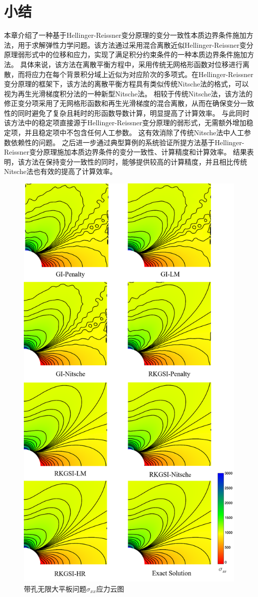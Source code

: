\section{小结}
本章介绍了一种基于Hellinger-Reissner变分原理的变分一致性本质边界条件施加方法，用于求解弹性力学问题。该方法通过采用混合离散近似Hellinger-Reissner变分原理弱形式中的位移和应力，实现了满足积分约束条件的一种本质边界条件施加方法。
具体来说，该方法在离散平衡方程中，采用传统无网格形函数对位移进行离散，而将应力在每个背景积分域上近似为对应阶次的多项式。在Hellinger-Reissner变分原理的框架下，该方法的离散平衡方程具有类似传统Nitsche法的格式，可以视为再生光滑梯度积分法的一种新型Nitsche法。
相较于传统Nitsche法，该方法的修正变分项采用了无网格形函数和再生光滑梯度的混合离散，从而在确保变分一致性的同时避免了复杂且耗时的形函数导数计算，明显提高了计算效率。
与此同时该方法中的稳定项直接源于Hellinger-Reissner变分原理的弱形式，无需额外增加稳定项，并且稳定项中不包含任何人工参数。
这有效消除了传统Nitsche法中人工参数依赖性的问题。
之后进一步通过典型算例的系统验证所提方法基于Hellinger-Reissner变分原理施加本质边界条件的变分一致性、计算精度和计算效率。
结果表明，该方法在保持变分一致性的同时，能够提供较高的计算精度，并且相比传统Nitsche法也有效的提高了计算效率。
\begin{figure}[H]
    \centering
    \includegraphics[scale=0.55]{figure/EHR/hole/sigmaxx.png}
\caption{带孔无限大平板问题$\sigma_{xx}$应力云图}\label{sigmaxx}
\end{figure}
